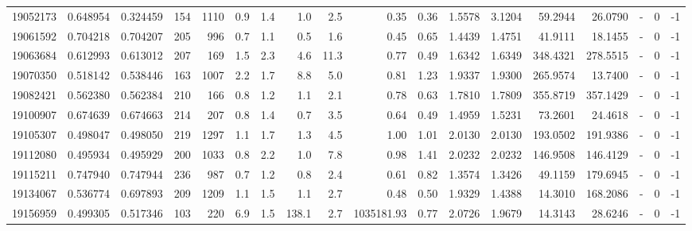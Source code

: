 \begin{tabular}{rrrrrrrrrrrrrrrlrr}
  19052173 & 0.648954 &   0.324459 &  154 & 1110 &      0.9 &      1.4 &     1.0 &      2.5 &       0.35 &        0.36 &  1.5578 &  3.1204 &   59.2944 &   26.0790 &             - &        0 &         -1 \\
  19061592 & 0.704218 &   0.704207 &  205 &  996 &      0.7 &      1.1 &     0.5 &      1.6 &       0.45 &        0.65 &  1.4439 &  1.4751 &   41.9111 &   18.1455 &             - &        0 &         -1 \\
  19063684 & 0.612993 &   0.613012 &  207 &  169 &      1.5 &      2.3 &     4.6 &     11.3 &       0.77 &        0.49 &  1.6342 &  1.6349 &  348.4321 &  278.5515 &             - &        0 &         -1 \\
  19070350 & 0.518142 &   0.538446 &  163 & 1007 &      2.2 &      1.7 &     8.8 &      5.0 &       0.81 &        1.23 &  1.9337 &  1.9300 &  265.9574 &   13.7400 &             - &        0 &         -1 \\
  19082421 & 0.562380 &   0.562384 &  210 &  166 &      0.8 &      1.2 &     1.1 &      2.1 &       0.78 &        0.63 &  1.7810 &  1.7809 &  355.8719 &  357.1429 &             - &        0 &         -1 \\
  19100907 & 0.674639 &   0.674663 &  214 &  207 &      0.8 &      1.4 &     0.7 &      3.5 &       0.64 &        0.49 &  1.4959 &  1.5231 &   73.2601 &   24.4618 &             - &        0 &         -1 \\
  19105307 & 0.498047 &   0.498050 &  219 & 1297 &      1.1 &      1.7 &     1.3 &      4.5 &       1.00 &        1.01 &  2.0130 &  2.0130 &  193.0502 &  191.9386 &             - &        0 &         -1 \\
  19112080 & 0.495934 &   0.495929 &  200 & 1033 &      0.8 &      2.2 &     1.0 &      7.8 &       0.98 &        1.41 &  2.0232 &  2.0232 &  146.9508 &  146.4129 &             - &        0 &         -1 \\
  19115211 & 0.747940 &   0.747944 &  236 &  987 &      0.7 &      1.2 &     0.8 &      2.4 &       0.61 &        0.82 &  1.3574 &  1.3426 &   49.1159 &  179.6945 &             - &        0 &         -1 \\
  19134067 & 0.536774 &   0.697893 &  209 & 1209 &      1.1 &      1.5 &     1.1 &      2.7 &       0.48 &        0.50 &  1.9329 &  1.4388 &   14.3010 &  168.2086 &             - &        0 &         -1 \\
  19156959 & 0.499305 &   0.517346 &  103 &  220 &      6.9 &      1.5 &   138.1 &      2.7 & 1035181.93 &        0.77 &  2.0726 &  1.9679 &   14.3143 &   28.6246 &             - &        0 &         -1 \\

\end{tabular}
